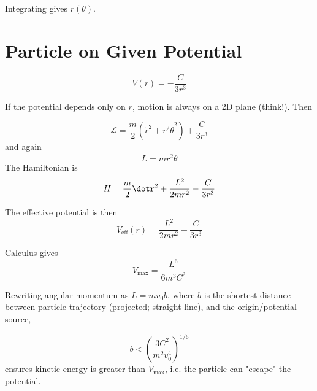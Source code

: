 \documentclass[12pt]{article}
\begin{document}
Integrating gives $r(\theta)$.

\section{Particle on Given Potential}

$$V(r) = -\frac{C}{3r^3}$$

If the potential depends only on $r$, motion is always on a 2D plane (think!). Then

$$\mathcal L = \frac{m}{2}(\dot r^2 + r^2\dot\theta^2) + \frac{C}{3r^3}$$
and again
$$L = mr^2\dot\theta$$
The Hamiltonian is
$$H = \frac{m}{2}\dotr^2 + \frac{L^2}{2mr^2} - \frac{C}{3r^3}$$

The effective potential is then
$$V_{\text{eff}}(r) = \frac{L^2}{2mr^2} - \frac{C}{3r^3}$$

Calculus gives
$$V_{\text{max}} = \frac{L^6}{6m^3C^2}$$

Rewriting angular momentum as $L = mv_0b$, where $b$ is the shortest distance between particle trajectory (projected; straight line), and the origin/potential source,

$$b < \left(\frac{3C^2}{m^2v_0^4}\right)^{1/6}$$
ensures kinetic energy is greater than $V_{\text{max}}$, i.e. the particle can "escape" the potential.
\end{document}
